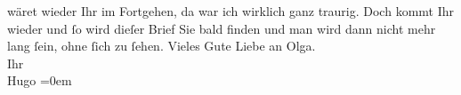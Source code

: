 \begin{ledgroupsized}[t]{13cm}
               wäret wieder Ihr im Fortgehen, da war ich wirklich ganz traurig. Doch kommt Ihr
               wieder und ſo wird dieſer Brief Sie bald finden und man wird dann nicht mehr lang
               ſein, ohne ſich zu ſehen.\pend
           \pstart
           Vieles Gute Liebe an Olga.{\\[\baselineskip]}Ihr{\\[\baselineskip]}\spacefill\mbox{Hugo}\pend
           \leftskip=0em{}\endnumbering{}\end{ledgroupsized}  \newcommand{\dateiname}{L02021}\newcommand{\titel}{Hugo von Hofmannsthal an Arthur Schnitzler, 2. 6. [1911]}\newcommand{\editorInnen}{Martin Anton Müller und Gerd-Hermann Susen}
      